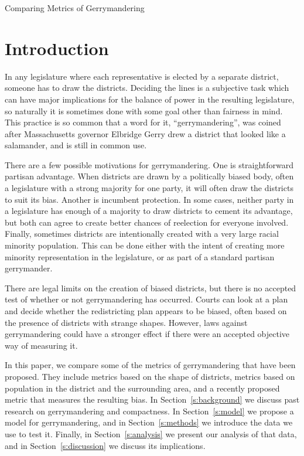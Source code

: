 \documentclass[12pt]{article}
\begin{document}
  \begin{center}
    \LARGE Comparing Metrics of Gerrymandering
    \vspace{-0.5em}
  \end{center}
  \nocite{*}
  \doublespacing{}

  \section{Introduction}

  In any legislature where each representative is elected by a separate district, someone has to draw the districts. Deciding the lines is a subjective task which can have major implications for the balance of power in the resulting legislature, so naturally it is sometimes done with some goal other than fairness in mind. This practice is so common that a word for it, ``gerrymandering'', was coined after Massachusetts governor Elbridge Gerry drew a district that looked like a salamander, and is still in common use.

There are a few possible motivations for gerrymandering. One is straightforward partisan advantage. When districts are drawn by a politically biased body, often a legislature with a strong majority for one party, it will often draw the districts to suit its bias. Another is incumbent protection. In some cases, neither party in a legislature has enough of a majority to draw districts to cement its advantage, but both can agree to create better chances of reelection for everyone involved. Finally, sometimes districts are intentionally created with a very large racial minority population. This can be done either with the intent of creating more minority representation in the legislature, or as part of a standard partisan gerrymander.

There are legal limits on the creation of biased districts, but there is no accepted test of whether or not gerrymandering has occurred. Courts can look at a plan and decide whether the redistricting plan appears to be biased, often based on the presence of districts with strange shapes. However, laws against gerrymandering could have a stronger effect if there were an accepted objective way of measuring it.

In this paper, we compare some of the metrics of gerrymandering that have been proposed. They include metrics based on the shape of districts, metrics based on population in the district and the surrounding area, and a recently proposed metric that measures the resulting bias.  In Section~\ref{s:background} we discuss past research on gerrymandering and compactness.  In Section~\ref{s:model} we propose a model for gerrymandering, and in Section~\ref{s:methods} we introduce the data we use to test it.  Finally, in Section~\ref{s:analysis} we present our analysis of that data, and in Section~\ref{s:discussion} we discuss its implications.
\end{document}
